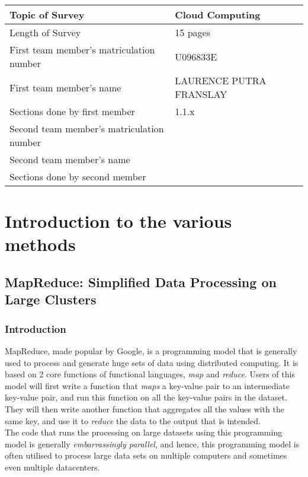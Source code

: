 \documentclass[]{article}
\begin{document}
\begin{table}[here]
\centering
\begin{tabularx}{\textwidth}{| X | X | }
\hline
Topic of Survey								& 	Cloud Computing\\
\hline
Length of Survey							& 	15 pages\\
\hline
First team member's matriculation number	&	U096833E\\
\hline
First team member's name					&	LAURENCE PUTRA FRANSLAY\\
\hline
Sections done by first member				& 	1.1.x\\
\hline
Second team member's matriculation number	&	\\
\hline
Second team member's name					&	\\
\hline
Sections done by second member				& 	\\
\hline

\hline
\end{tabularx}
\end{table}

\pagebreak

\section{Introduction to the various methods}
\subsection{MapReduce: Simplified Data Processing on Large Clusters}
\subsubsection{Introduction}
MapReduce, made popular by Google, is a programming model that is generally used to process and generate huge sets of data using distributed computing. It is based on 2 core functions of functional languages, \emph{map} and \emph{reduce}. Users of this model will first write a function that \emph{maps} a key-value pair to an intermediate key-value pair, and run this function on all the key-value pairs in the dataset. They will then write another function that aggregates all the values with the same key, and use it to \emph{reduce} the data to the output that is intended. \\

The code that runs the processing on large datasets using this programming model is generally \emph{embarrassingly parallel}\footnotemark{}, and hence, this programming model is often utilised to process large data sets on multiple computers and sometimes even multiple datacenters. \\
\end{document}
